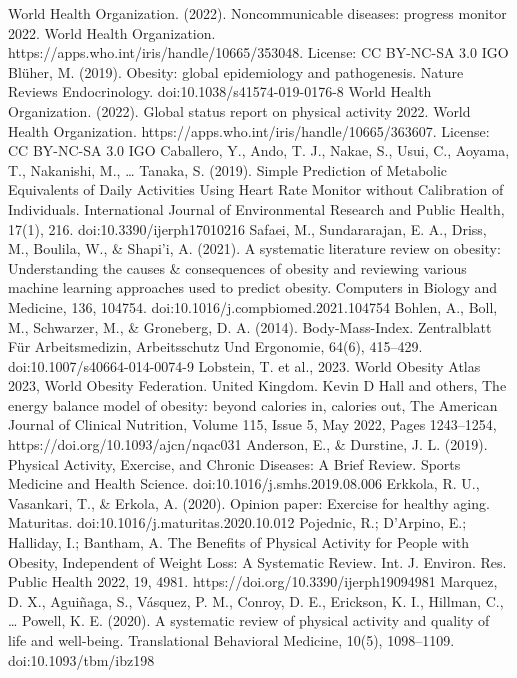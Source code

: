 \documentclass[12pt,twoside]{report}
\begin{document}
\begin{thebibliography}{}
    World Health Organization. (2022). Noncommunicable diseases: progress monitor 2022. World Health Organization. https://apps.who.int/iris/handle/10665/353048. License: CC BY-NC-SA 3.0 IGO
    Blüher, M. (2019). Obesity: global epidemiology and pathogenesis. Nature Reviews Endocrinology. doi:10.1038/s41574-019-0176-8
    World Health Organization. (2022). Global status report on physical activity 2022. World Health Organization. https://apps.who.int/iris/handle/10665/363607. License: CC BY-NC-SA 3.0 IGO
    Caballero, Y., Ando, T. J., Nakae, S., Usui, C., Aoyama, T., Nakanishi, M., … Tanaka, S. (2019). Simple Prediction of Metabolic Equivalents of Daily Activities Using Heart Rate Monitor without Calibration of Individuals. International Journal of Environmental Research and Public Health, 17(1), 216. doi:10.3390/ijerph17010216
    Safaei, M., Sundararajan, E. A., Driss, M., Boulila, W., \& Shapi’i, A. (2021). A systematic literature review on obesity: Understanding the causes \& consequences of obesity and reviewing various machine learning approaches used to predict obesity. Computers in Biology and Medicine, 136, 104754. doi:10.1016/j.compbiomed.2021.104754 
    Bohlen, A., Boll, M., Schwarzer, M., \& Groneberg, D. A. (2014). Body-Mass-Index. Zentralblatt Für Arbeitsmedizin, Arbeitsschutz Und Ergonomie, 64(6), 415–429. doi:10.1007/s40664-014-0074-9
    Lobstein, T. et al., 2023. World Obesity Atlas 2023, World Obesity Federation. United Kingdom.
    Kevin D Hall and others, The energy balance model of obesity: beyond calories in, calories out, The American Journal of Clinical Nutrition, Volume 115, Issue 5, May 2022, Pages 1243–1254, https://doi.org/10.1093/ajcn/nqac031
    Anderson, E., \& Durstine, J. L. (2019). Physical Activity, Exercise, and Chronic Diseases: A Brief Review. Sports Medicine and Health Science. doi:10.1016/j.smhs.2019.08.006
    Erkkola, R. U., Vasankari, T., \& Erkola, A. (2020). Opinion paper: Exercise for healthy aging. Maturitas. doi:10.1016/j.maturitas.2020.10.012 
    Pojednic, R.; D'Arpino, E.; Halliday, I.; Bantham, A. The Benefits of Physical Activity for People with Obesity, Independent of Weight Loss: A Systematic Review. Int. J. Environ. Res. Public Health 2022, 19, 4981. https://doi.org/10.3390/ijerph19094981
    Marquez, D. X., Aguiñaga, S., Vásquez, P. M., Conroy, D. E., Erickson, K. I., Hillman, C., … Powell, K. E. (2020). A systematic review of physical activity and quality of life and well-being. Translational Behavioral Medicine, 10(5), 1098–1109. doi:10.1093/tbm/ibz198

\end{thebibliography}
\end{document}
